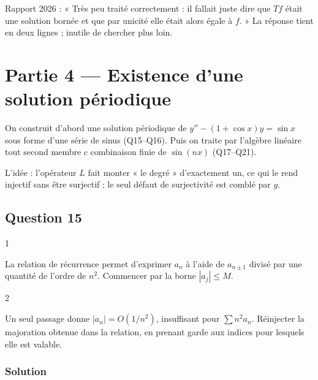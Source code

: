 \documentclass[11pt,a4paper]{article}
\begin{document}
\begin{jury}

Rapport 2026 : « Très peu traité correctement : il fallait juste dire que \(Tf\) était une solution bornée et que par unicité elle était alors égale à \(f\). » La réponse tient en deux lignes ; inutile de chercher plus loin.

\end{jury}

\hypertarget{partie-4-existence-dune-solution-puxe9riodique}{%
\section{Partie 4 --- Existence d'une solution périodique}\label{partie-4-existence-dune-solution-puxe9riodique}}

On construit d'abord une solution périodique de \(y''-(1+\cos x)y=\sin x\) sous forme d'une série de sinus (Q15--Q16). Puis on traite par l'algèbre linéaire tout second membre \(c\) combinaison finie de \(\sin(nx)\) (Q17--Q21).

L'idée : l'opérateur \(L\) fait monter « le degré » d'exactement un, ce qui le rend injectif sans être surjectif ; le seul défaut de surjectivité est comblé par \(g\).

\hypertarget{question-15}{%
\subsection{Question 15}\label{question-15}}

\begin{indication}{1}

La relation de récurrence permet d'exprimer \(a_n\) à l'aide de \(a_{n\pm1}\) divisé par une quantité de l'ordre de \(n^2\). Commencer par la borne \(|a_j|\le M\).

\end{indication}

\begin{indication}{2}

Un seul passage donne \(|a_n|=O(1/n^2)\), insuffisant pour \(\sum n^2a_n\). Réinjecter la majoration obtenue dans la relation, en prenant garde aux indices pour lesquels elle est valable.

\end{indication}

\hypertarget{solution-14}{%
\subsubsection{Solution}\label{solution-14}}
\end{document}
